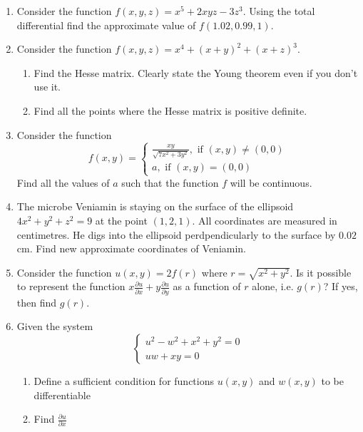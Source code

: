 \documentclass[12pt]{article} %
\theoremstyle{definition} %
\begin{document}
\begin{enumerate}

\item Consider the function $f(x,y,z)=x^5+2xyz-3z^3$. Using the total differential find the approximate value of $f(1.02,0.99,1)$.

\item Consider the function $f(x,y,z)=x^4+(x+y)^2+(x+z)^3$.
\begin{enumerate}
\item Find the Hesse matrix. Clearly state the Young theorem even if you don't use it.
\item Find all the points where the Hesse matrix is positive definite.
\end{enumerate}

\item Consider the function
\begin{equation} \nonumber
f(x,y)=
\begin{cases}
	\frac{xy}{\sqrt{7x^2+3y^2}}, \text{ if } (x,y)\neq (0,0) \\
	a, \text{ if } (x,y)=(0,0)
\end{cases}
\end{equation}
Find all the values of $a$ such that the function $f$ will be continuous.


\item The microbe Veniamin is staying on the surface of the ellipsoid $4x^2+y^2+z^2=9$ at the point $(1,2,1)$. All coordinates are measured in centimetres. He digs into the ellipsoid perdpendicularly to the surface by $0.02$ cm. Find new approximate coordinates of Veniamin.

\item Consider the function $u(x,y)=2f(r)$ where $r=\sqrt{x^2+y^2}$. Is it possible to represent the function $x\frac{\partial u}{\partial x}+y\frac{\partial u}{\partial y}$ as a function of $r$ alone, i.e. $g(r)$? If yes, then find $g(r)$.

\item Given the system
\begin{equation} \nonumber
\begin{cases}
u^2-w^2+x^2+y^2=0 \\
uw+xy=0
\end{cases}
\end{equation}
\begin{enumerate}
\item Define a sufficient condition for functions $u(x,y)$ and $w(x,y)$ to be differentiable
\item Find $\frac{\partial u}{\partial x}$
\end{enumerate}

\end{enumerate}
\end{document}
